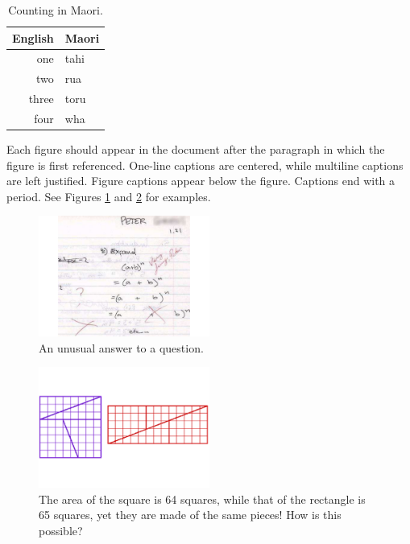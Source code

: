 \documentclass{wscpaperproc}
\theoremstyle{wsc}
\begin{document}
\begin{table}[htb]
\centering
\caption{Counting in Maori.\label{tab: second}}
\begin{tabular}{r|l}
English & Maori \\ \hline
one & tahi \\
two & rua \\
three & toru \\
four & wha \\
\end{tabular}
\end{table}

Each figure should appear in the document after the paragraph in which the figure is first referenced. One-line captions are centered,
while multiline captions are left justified. Figure captions appear below the figure. 
Captions end with a period. 
See Figures \ref{fig: tahi} and \ref{fig: rua} for examples.

\begin{figure}[htb]
{
\centering
\includegraphics[width=0.50\textwidth]{MathExpandExpression}
\caption{An unusual answer to a question.\label{fig: tahi}}
}
\end{figure}

\begin{figure}[htb]
{
\centering
\includegraphics[width=0.50\textwidth]{puzzle}
\caption{The area of the square is 64 squares, while that of the rectangle is 65 squares, yet they are made of the same pieces! How
is this possible? \label{fig: rua}}
}
\end{figure}
\end{document}
